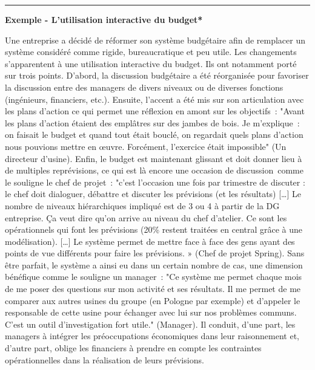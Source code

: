 \documentclass[oneside]{kaobook}
\begin{document}
\noindent\rule{\textwidth}{0.5pt}
\textbf{Exemple - L'utilisation interactive du budget*}

Une entreprise a décidé de réformer son système budgétaire afin de remplacer un système considéré comme rigide, bureaucratique et peu utile. Les changements s'apparentent à une utilisation interactive du budget. Ils ont notamment porté sur trois points. D'abord, la discussion budgétaire a été réorganisée pour favoriser la discussion entre des managers de divers niveaux ou de diverses fonctions (ingénieurs, financiers, etc.). Ensuite, l'accent a été mis sur son articulation avec les plans d'action ce qui permet une réflexion en amont sur les objectifs : "Avant les plans d'action étaient des emplâtres sur des jambes de bois. Je m'explique : on faisait le budget et quand tout était bouclé, on regardait quels plans d'action nous pouvions mettre en œuvre. Forcément, l'exercice était impossible" (Un directeur d'usine). Enfin, le budget est maintenant glissant et doit donner lieu à de multiples reprévisions, ce qui est là encore une occasion de discussion comme le souligne le chef de projet : "c'est l'occasion une fois par trimestre de discuter : le chef doit dialoguer, débattre et discuter les prévisions (et les résultats) [\ldots{}] Le nombre de niveaux hiérarchiques impliqué est de 3 ou 4 à partir de la DG entreprise. Ça veut dire qu'on arrive au niveau du chef d'atelier. Ce sont les opérationnels qui font les prévisions (20\% restent traitées en central grâce à une modélisation). [\ldots{}] Le système permet de mettre face à face des gens ayant des points de vue différents pour faire les prévisions. » (Chef de projet Spring). Sans être parfait, le système a ainsi eu dans un certain nombre de cas, une dimension bénéfique comme le souligne un manager : "Ce système me permet chaque mois de me poser des questions sur mon activité et ses résultats. Il me permet de me comparer aux autres usines du groupe (en Pologne par exemple) et d'appeler le responsable de cette usine pour échanger avec lui sur nos problèmes communs. C'est un outil d'investigation fort utile." (Manager). Il conduit, d'une part, les managers à intégrer les préoccupations économiques dans leur raisonnement et, d'autre part, oblige les financiers à prendre en compte les contraintes opérationnelles dans la réalisation de leurs prévisions.
\end{document}

